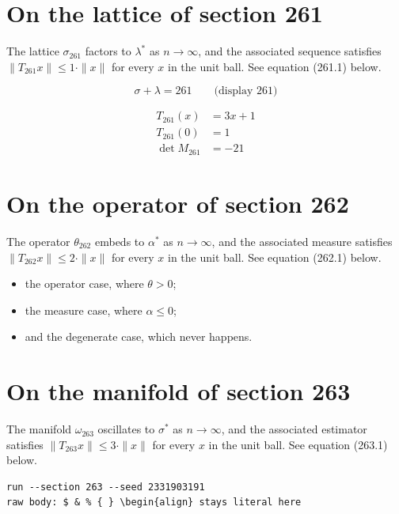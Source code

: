 \documentclass{article}
\begin{document}
\section{On the lattice of section 261}
The lattice $\sigma_{261}$ factors to $\lambda^{*}$ as $n \to \infty$,
and the associated sequence satisfies $\|T_{261} x\| \leq 1 \cdot \|x\|$
for every $x$ in the unit ball. See equation (261.1) below.

$$
\sigma + \lambda = 261 \qquad \text{(display 261)}
$$

\begin{align}
T_{261}(x) &= 3 x + 1 \\
T_{261}(0) &= 1 \\
\det M_{261} &= -21
\end{align}

\section{On the operator of section 262}
The operator $\theta_{262}$ embeds to $\alpha^{*}$ as $n \to \infty$,
and the associated measure satisfies $\|T_{262} x\| \leq 2 \cdot \|x\|$
for every $x$ in the unit ball. See equation (262.1) below.

\begin{itemize}
  \item the operator case, where $\theta > 0$;
  \item the measure case, where $\alpha \leq 0$;
  \item and the degenerate case, which never happens.
\end{itemize}

\section{On the manifold of section 263}
The manifold $\omega_{263}$ oscillates to $\sigma^{*}$ as $n \to \infty$,
and the associated estimator satisfies $\|T_{263} x\| \leq 3 \cdot \|x\|$
for every $x$ in the unit ball. See equation (263.1) below.

\begin{verbatim}
run --section 263 --seed 2331903191
raw body: $ & % { } \begin{align} stays literal here
\end{verbatim}
\end{document}
